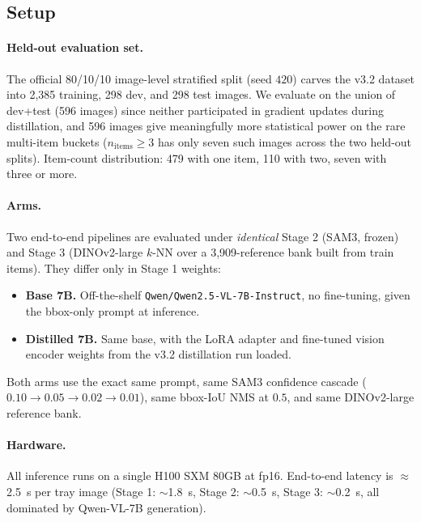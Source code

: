 \subsection{Setup}
\label{sec:exp:setup}

\paragraph{Held-out evaluation set.} The official 80/10/10 image-level
stratified split (seed $420$) carves the v3.2 dataset into 2{,}385 training,
298 dev, and 298 test images. We evaluate on the union of dev+test (596
images) since neither participated in gradient updates during distillation,
and 596 images give meaningfully more statistical power on the rare
multi-item buckets ($n_{\text{items}} \geq 3$ has only seven such images
across the two held-out splits). Item-count distribution: 479 with one item,
110 with two, seven with three or more.

\paragraph{Arms.} Two end-to-end pipelines are evaluated under
\emph{identical} Stage 2 (SAM3, frozen) and Stage 3 (DINOv2-large $k$-NN
over a 3{,}909-reference bank built from train items). They differ only in
Stage 1 weights:

\begin{itemize}\itemsep1pt
  \item \textbf{Base 7B.} Off-the-shelf \texttt{Qwen/Qwen2.5-VL-7B-Instruct},
    no fine-tuning, given the bbox-only prompt at inference.
  \item \textbf{Distilled 7B.} Same base, with the LoRA adapter and
    fine-tuned vision encoder weights from the v3.2 distillation run loaded.
\end{itemize}

Both arms use the exact same prompt, same SAM3 confidence cascade
($0.10 \rightarrow 0.05 \rightarrow 0.02 \rightarrow 0.01$), same bbox-IoU
NMS at $0.5$, and same DINOv2-large reference bank.

\paragraph{Hardware.} All inference runs on a single H100 SXM 80GB at fp16.
End-to-end latency is $\approx$2.5~s per tray image (Stage 1: $\sim$1.8~s,
Stage 2: $\sim$0.5~s, Stage 3: $\sim$0.2~s, all dominated by Qwen-VL-7B
generation).

